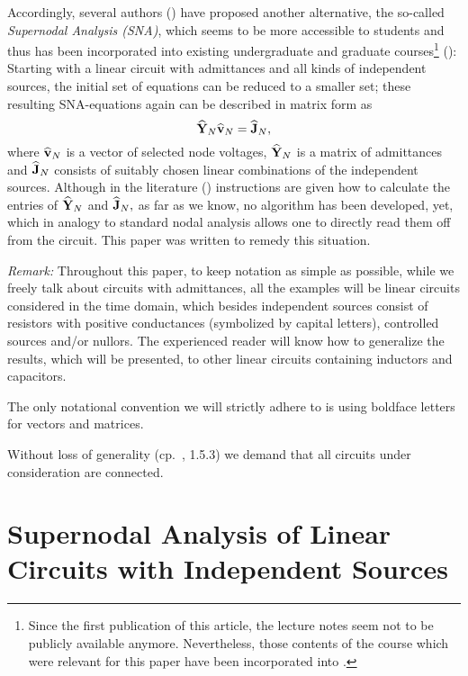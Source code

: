 \documentclass[10pt,journal,twocolumn,pagenumbers]{IEEEtran}
\begin{document}
Accordingly, several authors (\cite{SommerSuper,ChenDavis}) have proposed another alternative, the so-called {\sl Supernodal Ana\-ly\-sis (SNA)}, which seems to be more accessible to students and thus has been incorporated into existing undergraduate and graduate courses\footnote{Since the first publication of this article, the lecture notes \cite{SommerVL} seem not to be publicly available anymore. Nevertheless, those contents of the course which were relevant for this paper have been incorporated into \cite{SommerGST}.} (\cite{Davis,SommerVL,GerbrachtVL}):
Starting with a linear circuit with admittances and all kinds of independent sources, the initial set of equations can be reduced to a smaller set; these resulting SNA-equations again can be described in matrix form as
\begin{equation*}
\widehat{\bf Y}_N \widehat{\bf v}_N = \widehat{\bf J}_N,
\end{equation*}
where $\widehat{\bf v}_N$ is a vector of selected node voltages, $\widehat{\bf Y}_N$ is a matrix of admittances and $\widehat{\bf J}_N$ consists of suitably chosen linear combinations of the independent sources. Although in the literature (\cite{ChenDavis,Davis}) instructions are given how to calculate the entries  of  $\widehat{\bf Y}_N$ and $\widehat{\bf J}_N,$  as far as we know, no algorithm has been developed, yet, which in analogy to standard nodal analysis allows one to directly read them off from the circuit. This paper was written to remedy this situation.

\smallskip
{\em Remark:}\;
Throughout this paper, to keep notation as simple as possible, while we freely talk about circuits with admittances, all the examples will be linear circuits con\-sider\-ed in the time domain, which besides independent sources consist of resistors with positive conductances (symbolized by capital letters), controlled sources and/or nullors. The experienced reader will know how to generalize the results, which will be presented, to other linear circuits containing inductors and capacitors.

The only notational convention we will strictly adhere to is using boldface letters for vectors and matrices. 

\smallskip
Without loss of generality (cp.\ \cite{ChuaDesoerKuh}, 1.5.3) we demand that all circuits under consideration are connected.





\section{Supernodal Analysis of Linear Circuits with Independent Sources}
\end{document}
